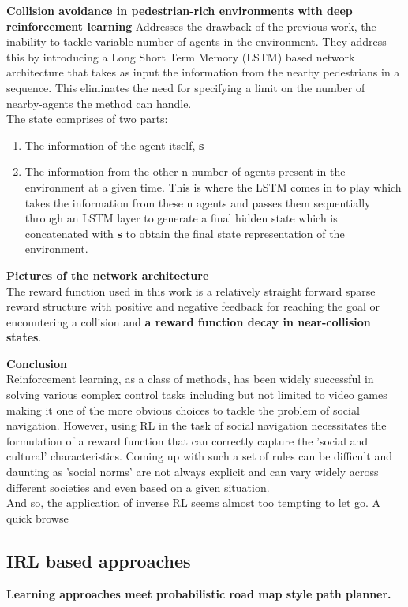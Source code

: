 \textbf{Collision avoidance in pedestrian-rich environments with deep reinforcement learning}
Addresses the drawback of the previous work, the inability to tackle variable number of agents in the environment. They address this by introducing a Long Short Term Memory (LSTM) based network architecture that takes as input the information from the nearby pedestrians in a sequence. This eliminates the need for specifying a limit on the number of nearby-agents the method can handle.\\
The state comprises of two parts: 
\begin{enumerate}
	\item The information of the agent itself, \textbf{s}
	\item The information from the other n number of agents present in the environment at a given time. This is where the LSTM comes in to play which takes the information from these n agents and passes them sequentially through an LSTM layer to generate a final hidden state which is concatenated with \textbf{s} to obtain the final state representation of the environment.
\end{enumerate}
\textbf{Pictures of the network architecture}
\\
The reward function used in this work is a relatively straight forward sparse reward structure with positive and negative feedback for reaching the goal or encountering a collision and \textbf{a reward function decay in near-collision states}.  

\textbf{Conclusion}\\
Reinforcement learning, as a class of methods, has been widely successful in solving various complex control tasks including but not limited to video games making it one of the more obvious choices to tackle the problem of social navigation. 
However, using RL in the task of social navigation necessitates the formulation of a reward function that can correctly capture the 'social and cultural' characteristics. Coming up with such a set of rules can be difficult and daunting as 'social norms' are not always explicit and can vary widely across different societies and even based on a given situation.\\

And so, the application of inverse RL seems almost too tempting to let go. A quick browse 
\subsection*{IRL based approaches}
\textbf{Learning approaches meet probabilistic road map style path planner.}


